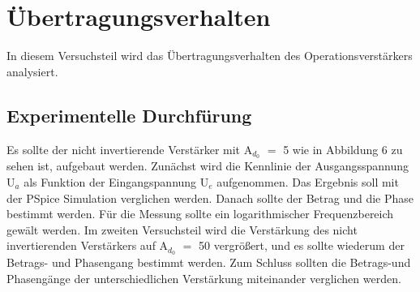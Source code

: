 \section{\"Ubertragungsverhalten}
In diesem Versuchsteil wird das \"Ubertragungsverhalten des Operationsverst\"arkers analysiert. 
\subsection{Experimentelle Durchf\"urung}
Es sollte der nicht invertierende Verst\"arker mit A$_{d_0}$ $=$ 5 wie in Abbildung 6 zu sehen ist, aufgebaut werden. Zun\"achst wird die Kennlinie der Ausgangsspannung U$_a$ als Funktion der Eingangspannung U$_e$ aufgenommen. Das Ergebnis soll mit der PSpice Simulation verglichen werden. Danach sollte der Betrag und die Phase bestimmt werden. F\"ur die Messung sollte ein logarithmischer Frequenzbereich gew\"alt werden. Im zweiten Versuchsteil wird die Verst\"arkung des nicht invertierenden Verst\"arkers auf A$_{d_0}$ $=$ 50 vergr\"o\ss ert, und es sollte wiederum der Betrags- und Phasengang bestimmt werden. Zum Schluss sollten die Betrags-und Phaseng\"ange der unterschiedlichen Verst\"arkung miteinander verglichen werden.
